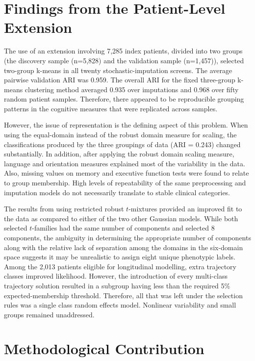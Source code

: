 \section{Findings from the Patient-Level Extension}

The use of an extension involving 7,285 index patients, divided into two groups (the discovery sample (n=5,828) and the validation sample (n=1,457)), selected two-group k-means in all twenty stochastic-imputation screens. The average pairwise validation ARI was 0.959. The overall ARI for the fixed three-group k-means clustering method averaged 0.935 over imputations and 0.968 over fifty random patient samples. Therefore, there appeared to be reproducible grouping patterns in the cognitive measures that were replicated across samples.

However, the issue of representation is the defining aspect of this problem. When using the equal-domain instead of the robust domain measure for scaling, the classifications produced by the three groupings of data (ARI = 0.243) changed substantially. In addition, after applying the robust domain scaling measure, language and orientation measures explained most of the variability in the data. Also, missing values on memory and executive function tests were found to relate to group membership. High levels of repeatability of the same preprocessing and imputation models do not necessarily translate to stable clinical categories.

The results from using restricted robust $t$-mixtures provided an improved fit to the data as compared to either of the two other Gaussian models. While both selected $t$-families had the same number of components and selected 8 components, the ambiguity in determining the appropriate number of components along with the relative lack of separation among the domains in the six-domain space suggests it may be unrealistic to assign eight unique phenotypic labels. Among the 2,013 patients eligible for longitudinal modelling, extra trajectory classes improved likelihood. However, the introduction of every multi-class trajectory solution resulted in a subgroup having less than the required 5\% expected-membership threshold. Therefore, all that was left under the selection rules was a single class random effects model. Nonlinear variability and small groups remained unaddressed.

\section{Methodological Contribution}

